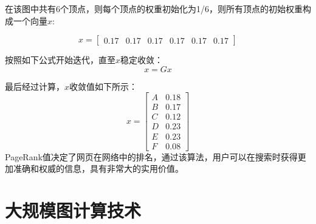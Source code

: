 在该图中共有6个顶点，则每个顶点的权重初始化为1/6，则所有顶点的初始权重构成一个向量$x$:

\[x = \left[ {\begin{array}{*{20}{c}}
{0.17}&{0.17}&{0.17}&{0.17}&{0.17}&{0.17}
\end{array}} \right]\]

按照如下公式开始迭代，直至$x$稳定收敛：
\[x = Gx\]

最后经过计算，$x$收敛值如下所示：
\[x = \left[ {\begin{array}{*{20}{c}}
A&{0.18}\\
B&{0.17}\\
C&{0.12}\\
D&{0.23}\\
E&{0.23}\\
F&{0.08}
\end{array}} \right]\]
PageRank值决定了网页在网络中的排名，通过该算法，用户可以在搜索时获得更加准确和权威的信息，具有非常大的实用价值。

\section{大规模图计算技术}

